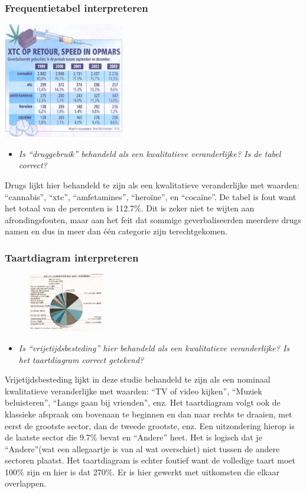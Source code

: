 \documentclass[dutch]{beamer}
\newcommand{\vraag}[1]{\begin{itemize}\item {\it #1}\end{itemize}}
\begin{document}
\begin{frame}
\frametitle{Frequentietabel interpreteren}
\begin{center}
  \includegraphics[width=0.4\textwidth]{tabel-drugs}
\end{center}
\vraag{Is “druggebruik” behandeld als een kwalitatieve veranderlijke? Is de tabel correct?}
\pause
Drugs lijkt hier behandeld te zijn als een kwalitatieve veranderlijke met
waarden: “cannabis”, “xtc”, “amfetamines”, “heroïne”, en “cocaïne”. De tabel is fout want het totaal van de percenten is 112.7\%. Dit is zeker niet te
wijten aan afrondingsfouten, maar aan het feit dat sommige geverbaliseerden meerdere drugs namen en dus in meer dan één categorie zijn terechtgekomen.
\end{frame}

\begin{frame}
\frametitle{Taartdiagram interpreteren}

\begin{figure}
  \includegraphics[width=0.3\textwidth]{cirkeldiagram-vrijetijdsbesteding}
\end{figure}
\vraag{Is “vrijetijdsbesteding” hier behandeld als een kwalitatieve veranderlijke? Is het taartdiagram correct getekend?}
\pause
Vrijetijdsbesteding lijkt in deze studie behandeld te zijn als een nominaal kwalitatieve veranderlijke met waarden: “TV of video kijken”, “Muziek beluisteren”, “Langs gaan bij vrienden”, enz. Het taartdiagram volgt ook de klassieke afspraak om bovenaan te beginnen en dan naar rechts te draaien, met eerst de grootste sector, dan de tweede grootste, enz. Een uitzondering hierop is de laatste sector die 9.7\% bevat en “Andere” heet. Het is logisch dat je “Andere”(wat een allegaartje is van al wat overschiet) niet tussen de andere sectoren plaatst. Het taartdiagram is echter foutief want de volledige taart moet 100\% zijn en hier is dat 270\%. Er is hier gewerkt met uitkomsten die elkaar overlappen.
\end{frame}
\end{document}

